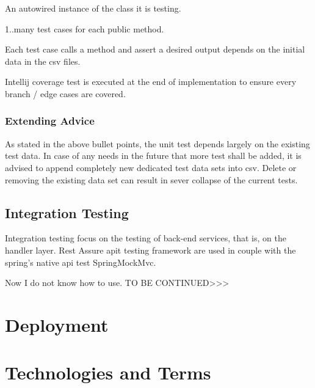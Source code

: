 \begin{compactenum}
	\item An autowired instance of the class it is testing.
    \item 1..many test cases for each public method.
    \item Each test case calls a method and assert a desired output depends on the initial data in the csv files.
    \item Intellij coverage test is executed at the end of implementation to ensure every branch / edge cases are covered.
\end{compactenum}

\subsubsection{Extending Advice}
As stated in the above bullet points, the unit test depends largely on the existing test data. In case of any needs in the future that more test shall be added, it is advised to append completely new dedicated test data sets into csv. Delete or removing the existing data set can result in sever collapse of the current tests.

\subsection{Integration Testing}
Integration testing focus on the testing of back-end services, that is, on the handler layer. Rest Assure apit testing framework are used in couple with the spring's native api test SpringMockMvc.

Now I do not know how to use. TO BE CONTINUED>>>

\section{Deployment}

\section{Technologies and Terms}

